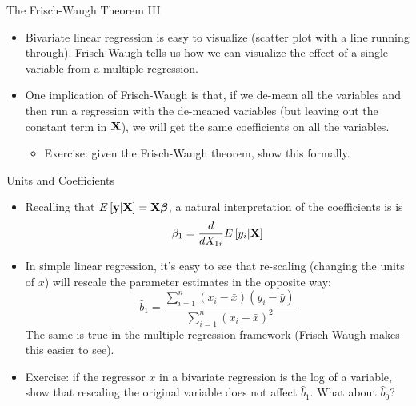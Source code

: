 \documentclass[english,xcolor={dvipsnames},aspectratio=169]{beamer}
\begin{document}
\begin{frame}{The Frisch-Waugh Theorem III}
\begin{itemize}
	\item Bivariate linear regression is easy to visualize (scatter plot with a line running through).
	Frisch-Waugh tells us how we can visualize the effect of a single variable from a multiple
	regression.

	\medskip
	\item One implication of Frisch-Waugh is that, if we de-mean all the variables and then 
	run a regression with the de-meaned variables (but leaving out the constant term in ${\bf X}$),
	we will get the same coefficients on all the variables.
	\begin{itemize}
		\item Exercise: given the Frisch-Waugh theorem, show this formally. 
	\end{itemize}
\end{itemize}
\end{frame}



\begin{frame}{Units and Coefficients}
\begin{itemize}
	\item Recalling that $E\left[{\bf y}|{\bf X}\right] = {\bf X} \boldsymbol{\beta}$, a natural interpretation	of
	the coefficients is 
	is \[
	\beta_1 = \frac{d }{d X_{1i}}E\left[y_i |{\bf X}\right]
	\]
	
	\item In simple linear regression, it's easy to see that re-scaling (changing the units
	of $x$) will rescale the parameter estimates in the opposite way:\[
		\hat{b}_1 =\frac{\sum\limits_{i=1}^n(x_i-\bar{x})(y_i-\bar{y})}{\sum\limits_{i=1}^n(x_i-\bar{x})^2}
	\]
 	The same is true in the multiple regression framework (Frisch-Waugh makes this easier to see). 

	\medskip
	\item Exercise: if the regressor $x$ in a bivariate regression
	is the log of a variable, show that rescaling the original variable does not
	affect $\hat{b}_1 $. What about $\hat{b}_0$? 
\end{itemize}
\end{frame}
\end{document}
